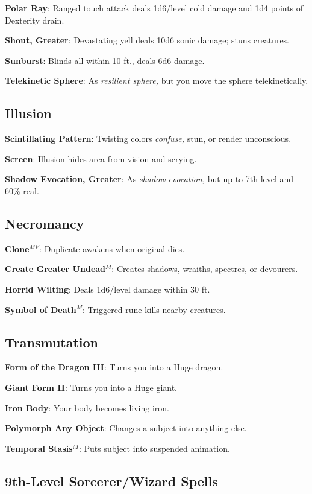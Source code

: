 \textbf{Polar Ray}: Ranged touch attack deals 1d6/level cold damage and 1d4 points of Dexterity drain.

\textbf{Shout, Greater}: Devastating yell deals 10d6 sonic damage; stuns creatures.

\textbf{Sunburst}: Blinds all within 10 ft., deals 6d6 damage.

\textbf{Telekinetic Sphere}: As\textit{ resilient sphere, }but you move the sphere telekinetically.

\subsection{Illusion}


\textbf{Scintillating Pattern}: Twisting colors \textit{confuse, }stun, or render unconscious.

\textbf{Screen}: Illusion hides area from vision and scrying.

\textbf{Shadow Evocation, Greater}: As \textit{shadow evocation, }but up to 7th level and 60\% real.

\subsection{Necromancy}


\textbf{Clone}\(^{MF}\): Duplicate awakens when original dies.

\textbf{Create Greater Undead}\(^{M}\): Creates shadows, wraiths, spectres, or devourers.

\textbf{Horrid Wilting}: Deals 1d6/level damage within 30 ft.

\textbf{Symbol of Death}\(^{M}\): Triggered rune kills nearby creatures.

\subsection{Transmutation}


\textbf{Form of the Dragon III}: Turns you into a Huge dragon.

\textbf{Giant Form II}: Turns you into a Huge giant.

\textbf{Iron Body}: Your body becomes living iron.

\textbf{Polymorph Any Object}: Changes a subject into anything else.

\textbf{Temporal Stasis}\(^{M}\): Puts subject into suspended animation.

\subsection{9th-Level Sorcerer/Wizard Spells}


